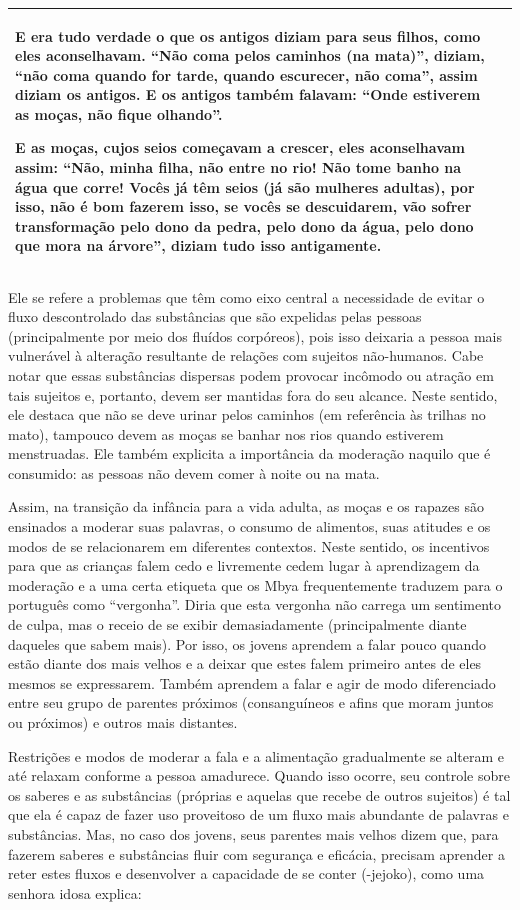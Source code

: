 \begin{flushleft}
\begin{supertabular}{m{2.86916in}|m{2.88726in}}
E era tudo verdade o que os antigos diziam para seus filhos, como eles
aconselhavam. ``Não coma pelos caminhos (na mata)'', diziam, ``não coma
quando for tarde, quando escurecer, não coma'', assim diziam os antigos.
E os antigos também falavam: ``Onde estiverem as moças, não fique
olhando''. 

E as moças, cujos seios começavam a crescer, eles aconselhavam assim:
``Não, minha filha, não entre no rio! Não tome banho na água que corre!
Vocês já têm seios (já são mulheres adultas), por isso, não é bom
fazerem isso, se vocês se descuidarem, vão sofrer transformação pelo
dono da pedra, pelo dono da água, pelo dono que mora na árvore'', diziam
tudo isso antigamente.\\\hline
\end{supertabular}
\end{flushleft}
Ele se refere a problemas que têm como eixo central a necessidade de
evitar o fluxo descontrolado das substâncias que são expelidas pelas
pessoas (principalmente por meio dos fluídos corpóreos), pois isso
deixaria a pessoa mais vulnerável à alteração resultante de relações
com sujeitos não-humanos. Cabe notar que essas substâncias dispersas
podem provocar incômodo ou atração em tais sujeitos e, portanto, devem
ser mantidas fora do seu alcance. Neste sentido, ele destaca que não se
deve urinar pelos caminhos (em referência às trilhas no mato), tampouco
devem as moças se banhar nos rios quando estiverem menstruadas. Ele
também explicita a importância da moderação naquilo que é consumido: as
pessoas não devem comer à noite ou na mata. 

Assim, na transição da infância para a vida adulta, as moças e os
rapazes são ensinados a moderar suas palavras, o consumo de alimentos,
suas atitudes e os modos de se relacionarem em diferentes contextos.
Neste sentido, os incentivos para que as crianças falem cedo e
livremente cedem lugar à aprendizagem da moderação e a uma certa
etiqueta que os Mbya frequentemente traduzem para o português como
``vergonha''. Diria que esta vergonha não carrega um sentimento de culpa,
mas o receio de se exibir demasiadamente (principalmente diante
daqueles que sabem mais). Por isso, os jovens aprendem a falar pouco
quando estão diante dos mais velhos e a deixar que estes falem primeiro
antes de eles mesmos se expressarem. Também aprendem a falar e agir de
modo diferenciado entre seu grupo de parentes próximos (consanguíneos e
afins que moram juntos ou próximos) e outros mais distantes. 

Restrições e modos de moderar a fala e a alimentação gradualmente se
alteram e até relaxam conforme a pessoa amadurece. Quando isso ocorre,
seu controle sobre os saberes e as substâncias (próprias e aquelas que
recebe de outros sujeitos) é tal que ela é capaz de fazer uso
proveitoso de um fluxo mais abundante de palavras e substâncias. Mas,
no caso dos jovens, seus parentes mais velhos dizem que, para fazerem
saberes e substâncias fluir com segurança e eficácia, precisam aprender
a reter estes fluxos e desenvolver a capacidade de se conter (-jejoko),
como uma senhora idosa explica:

